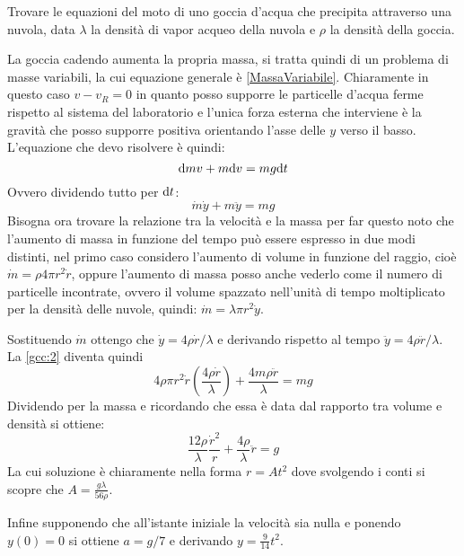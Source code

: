 \documentclass[../main.tex]{subfiles}
\begin{document}

\textex
Trovare le equazioni del moto di uno goccia d'acqua che precipita attraverso una nuvola, data $\lambda$ la densità di vapor acqueo della nuvola e $\rho$
la densità della goccia.

\solution

La goccia cadendo aumenta la propria massa, si tratta quindi di un problema di masse variabili, la cui equazione generale è \cref{MassaVariabile}.
Chiaramente in questo caso $v-v_{R}=0$ in quanto posso supporre le particelle d'acqua ferme rispetto al sistema del laboratorio e
l'unica forza esterna che interviene è la gravità che posso supporre positiva orientando l'asse delle $y$ verso il basso.
L'equazione che devo risolvere è quindi:
\begin{equation}\label{gcc:1}
\mathrm{d} mv+m\mathrm{d} v=mg\mathrm{d} t 
\end{equation}
Ovvero dividendo tutto per $\mathrm{d} t$:
\begin{equation}\label{gcc:2}
 \dot{m}\dot{y}+m\ddot{y}=mg
\end{equation}
Bisogna ora trovare la relazione tra la velocità e la massa per far questo noto che l'aumento di massa in funzione del tempo può essere espresso in due modi distinti,
nel primo caso considero l'aumento di volume in funzione del raggio, cioè $\dot{m}=\rho 4 \pi r^2 \dot{r}$, oppure l'aumento di massa posso anche vederlo
come il numero di particelle incontrate, ovvero il volume spazzato nell'unità di tempo moltiplicato per la densità delle nuvole, quindi:
$\dot{m}=\lambda \pi r^2 \dot{y}$. 

Sostituendo $\dot{m}$ ottengo che $\dot{y}=4\rho \dot{r}/{\lambda}$ e derivando rispetto al tempo $\ddot{y}=4\rho \ddot{r}/\lambda$. La \cref{gcc:2} diventa quindi
\begin{equation}\label{gcc:3}
 4\rho \pi r^2 \dot{r} (\frac{4 \rho \dot{r}}{\lambda})+\frac{4m\rho \ddot{r}}{\lambda}=mg
\end{equation}
Dividendo per la massa e ricordando che essa è data dal rapporto tra volume e densità si ottiene:
\begin{equation}\label{gcc:4}
 \frac{12\rho}{\lambda}\frac{\dot{r}^2}{r}+\frac{4\rho}{\lambda}\ddot{r}=g
\end{equation}
La cui soluzione è chiaramente nella forma $r=At^2$ dove svolgendo i conti si scopre che $A=\frac{g \lambda}{56 \rho}$.

Infine supponendo che all'istante iniziale la velocità sia nulla e ponendo $y(0)=0$ si ottiene $a=g/7$ e derivando $y=\frac{9}{14}t^2$.
\end{document}
